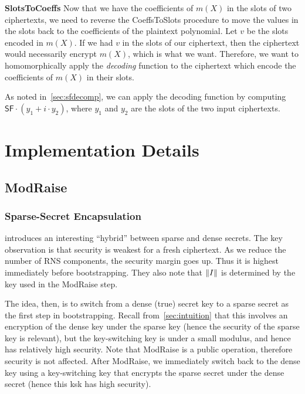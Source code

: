 \documentclass[../fheimpl.tex]{subfiles}
\begin{document}
    \textbf{SlotsToCoeffs} Now that we have the coefficients of $m(X)$ in the slots of two ciphertexts, we need to reverse the CoeffsToSlots procedure to move the values in the slots back to the coefficients of the plaintext polynomial. Let $v$ be the slots encoded in $m(X)$. If we had $v$ in the slots of our ciphertext, then the ciphertext would necessarily encrypt $m(X)$, which is what we want. Therefore, we want to homomorphically apply the \emph{decoding} function to the ciphertext which encode the coefficients of $m(X)$ in their slots. 
    
    As noted in~\cref{sec:sfdecomp}, we can apply the decoding function by computing $\mathsf{SF}\cdot (y_1+i\cdot y_2)$, where $y_1$ and $y_2$ are the slots of the two input ciphertexts. 
	
    \section{Implementation Details}
    
    \subsection{ModRaise}
    
    \subsubsection{Sparse-Secret Encapsulation}
    \cite{cryptoeprint:2022/024} introduces an interesting ``hybrid'' between sparse and dense secrets. The key observation is that security is weakest for a fresh ciphertext. As we reduce the number of RNS components, the security margin goes up. Thus it is highest immediately before bootstrapping. They also note that $\lVert I\rVert$ is determined by the key used in the ModRaise step. 
    
    The idea, then, is to switch from a dense (true) secret key to a sparse secret as the first step in bootstrapping. Recall from~\cref{sec:intuition} that this involves an encryption of the dense key under the sparse key (hence the security of the sparse key is relevant), but the key-switching key is under a small modulus, and hence has relatively high security.	
    Note that ModRaise is a public operation, therefore security is not affected. After ModRaise, we immediately switch back to the dense key using a key-switching key that encrypts the sparse secret under the dense secret (hence this ksk has high security).
    
\end{document}

